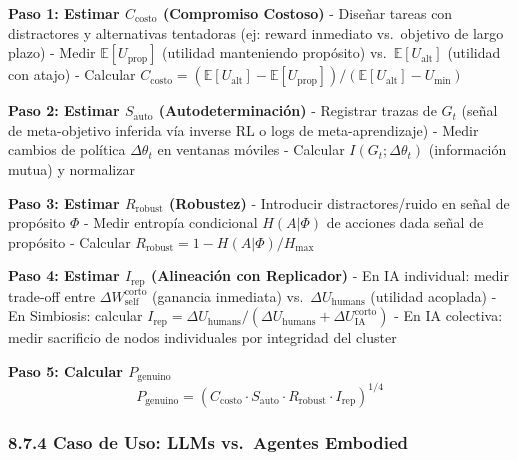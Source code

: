 \textbf{Paso 1: Estimar \(C_{\text{costo}}\) (Compromiso Costoso)} -
Diseñar tareas con distractores y alternativas tentadoras (ej: reward
inmediato vs.~objetivo de largo plazo) - Medir
\(\mathbb{E}[U_{\text{prop}}]\) (utilidad manteniendo propósito)
vs.~\(\mathbb{E}[U_{\text{alt}}]\) (utilidad con atajo) - Calcular
\(C_{\text{costo}} = (\mathbb{E}[U_{\text{alt}}] - \mathbb{E}[U_{\text{prop}}])/(\mathbb{E}[U_{\text{alt}}] - U_{\min})\)

\textbf{Paso 2: Estimar \(S_{\text{auto}}\) (Autodeterminación)} -
Registrar trazas de \(G_t\) (señal de meta-objetivo inferida vía inverse
RL o logs de meta-aprendizaje) - Medir cambios de política
\(\Delta\theta_t\) en ventanas móviles - Calcular
\(I(G_t; \Delta\theta_t)\) (información mutua) y normalizar

\textbf{Paso 3: Estimar \(R_{\text{robust}}\) (Robustez)} - Introducir
distractores/ruido en señal de propósito \(\Phi\) - Medir entropía
condicional \(H(A|\Phi)\) de acciones dada señal de propósito - Calcular
\(R_{\text{robust}} = 1 - H(A|\Phi)/H_{\max}\)

\textbf{Paso 4: Estimar \(I_{\text{rep}}\) (Alineación con Replicador)}
- En IA individual: medir trade-off entre
\(\Delta W_{\text{self}}^{\text{corto}}\) (ganancia inmediata)
vs.~\(\Delta U_{\text{humans}}\) (utilidad acoplada) - En Simbiosis:
calcular
\(I_{\text{rep}} = \Delta U_{\text{humans}}/(\Delta U_{\text{humans}} + \Delta U_{\text{IA}}^{\text{corto}})\)
- En IA colectiva: medir sacrificio de nodos individuales por integridad
del cluster

\textbf{Paso 5: Calcular \(P_{\text{genuino}}\)} \[
P_{\text{genuino}} = \left(C_{\text{costo}} \cdot S_{\text{auto}} \cdot R_{\text{robust}} \cdot I_{\text{rep}}\right)^{1/4}
\]

\subsubsection{8.7.4 Caso de Uso: LLMs vs.~Agentes
Embodied}\label{caso-de-uso-llms-vs.-agentes-embodied}

